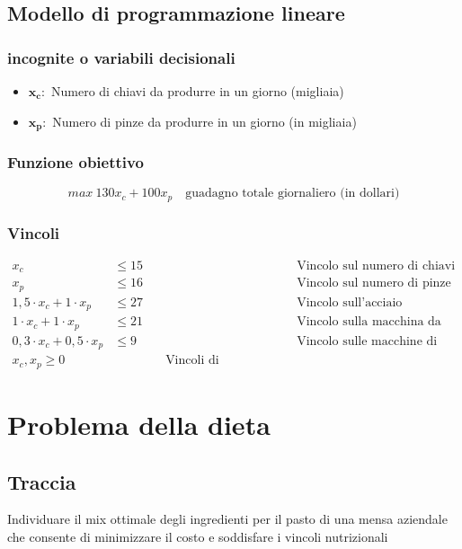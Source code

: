 \subsection{Modello di programmazione lineare}

\subsubsection{incognite o variabili decisionali}
\begin{itemize}
    \item $\mathbf{x_c}:$ Numero di chiavi da produrre in un giorno (migliaia)
    \item $\mathbf{x_p}:$ Numero di pinze da produrre in un giorno (in migliaia)
\end{itemize}

\subsubsection{Funzione obiettivo}
{
    \large
    $$
        max\ 130x_c + 100x_p \quad \text{guadagno totale giornaliero (in dollari)}
    $$
}

\subsubsection{Vincoli}

$$
    \begin{aligned}
        x_c &\leq 15 && \quad \text{Vincolo sul numero di chiavi producibili} \\
        x_p &\leq 16 && \quad \text{Vincolo sul numero di pinze producibili} \\
        1,5 \cdot x_c + 1 \cdot x_p &\leq 27 && \quad \text{Vincolo sull'acciaio} \\
        1 \cdot x_c + 1 \cdot x_p &\leq 21 && \quad \text{Vincolo sulla macchina da lavorazione} \\
        0,3 \cdot x_c + 0,5 \cdot x_p &\leq 9 && \quad \text{Vincolo sulle macchine di assemblaggio} \\
        x_c,x_p \geq 0 && \quad \text{Vincoli di nonnegatività}
    \end{aligned}
$$

\section{Problema della dieta}
\subsection{Traccia}
Individuare il mix ottimale degli ingredienti per il pasto di una mensa aziendale che consente di minimizzare il costo e soddisfare i vincoli nutrizionali

